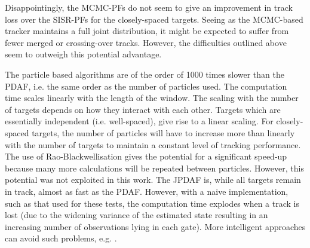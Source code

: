 Disappointingly, the MCMC-PFs do not seem to give an improvement in track loss over the SISR-PFs for the closely-spaced targets. Seeing as the MCMC-based tracker maintains a full joint distribution, it might be expected to suffer from fewer merged or crossing-over tracks. However, the difficulties outlined above seem to outweigh this potential advantage.

The particle based algorithms are of the order of 1000 times slower than the PDAF, i.e. the same order as the number of particles used. The computation time scales linearly with the length of the window. The scaling with the number of targets depends on how they interact with each other. Targets which are essentially independent (i.e. well-spaced), give rise to a linear scaling. For closely-spaced targets, the number of particles will have to increase more than linearly with the number of targets to maintain a constant level of tracking performance. The use of Rao-Blackwellisation gives the potential for a significant speed-up because many more calculations will be repeated between particles. However, this potential was not exploited in this work. The JPDAF is, while all targets remain in track, almost as fast as the PDAF. However, with a naive implementation, such as that used for these tests, the computation time explodes when a track is lost (due to the widening variance of the estimated state resulting in an increasing number of observations lying in each gate). More intelligent approaches can avoid such problems, e.g. \cite{Horridge2006}.